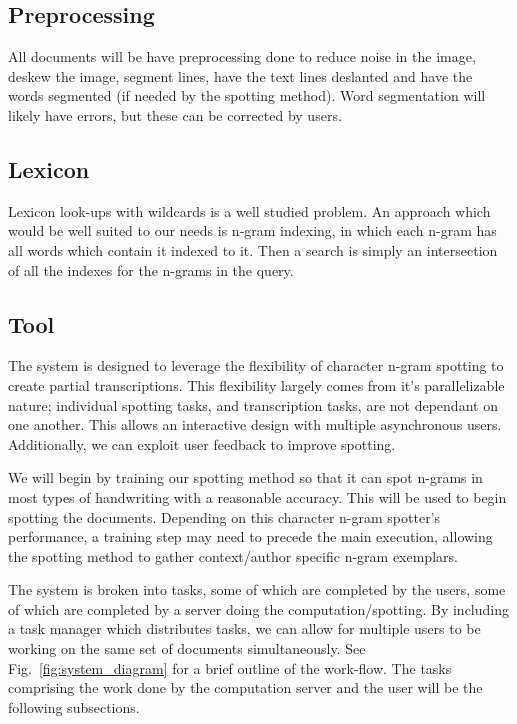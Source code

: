 \documentclass[ms]{byuprop}
\begin{document}
\subsection{Preprocessing}
All documents will be have preprocessing done to reduce noise in the image, deskew the image, segment lines, have the text lines deslanted and have the words segmented (if needed by the spotting method). Word segmentation will likely have errors, but these can be corrected by users.

\subsection{Lexicon}
Lexicon look-ups with wildcards is a well studied problem. An approach which would be well suited to our needs is n-gram indexing, in which each n-gram has all words which contain it indexed to it. Then a search is simply an intersection of all the indexes for the n-grams in the query.

\subsection{Tool}
The system is designed to leverage the flexibility of character n-gram spotting to create partial transcriptions. This flexibility largely comes from it's parallelizable nature; individual spotting tasks, and transcription tasks, are not dependant on one another. This allows an interactive design with multiple asynchronous users. Additionally, we can exploit user feedback to improve spotting.

We will begin by training our spotting method so that it can spot n-grams in most types of handwriting with a reasonable accuracy. This will be used to begin spotting the documents. Depending on this character n-gram spotter's performance, a training step may need to precede the main execution, allowing the spotting method to gather context/author specific n-gram exemplars. 

The system is broken into tasks, some of which are completed by the users, some of which are completed by a server doing the computation/spotting. By including a task manager which distributes tasks, we can allow for multiple users to be working on the same set of documents simultaneously. See Fig.~\ref{fig:system_diagram} for a brief outline of the work-flow. The tasks comprising the work done by the computation server and the user will be the following subsections.
\end{document}
